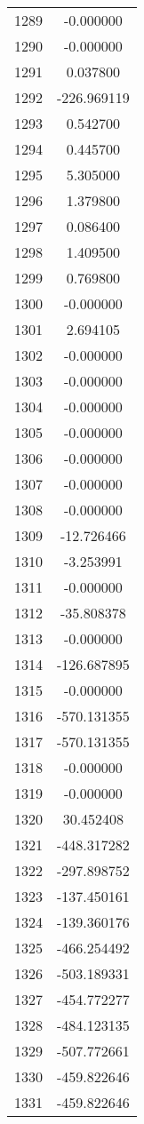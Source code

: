 \documentclass[12pt]{article}
\begin{document}
\begin{longtable}{@{}cc@{}}
1289 & -0.000000 \\
1290 & -0.000000 \\
1291 & 0.037800 \\
1292 & -226.969119 \\
1293 & 0.542700 \\
1294 & 0.445700 \\
1295 & 5.305000 \\
1296 & 1.379800 \\
1297 & 0.086400 \\
1298 & 1.409500 \\
1299 & 0.769800 \\
1300 & -0.000000 \\
1301 & 2.694105 \\
1302 & -0.000000 \\
1303 & -0.000000 \\
1304 & -0.000000 \\
1305 & -0.000000 \\
1306 & -0.000000 \\
1307 & -0.000000 \\
1308 & -0.000000 \\
1309 & -12.726466 \\
1310 & -3.253991 \\
1311 & -0.000000 \\
1312 & -35.808378 \\
1313 & -0.000000 \\
1314 & -126.687895 \\
1315 & -0.000000 \\
1316 & -570.131355 \\
1317 & -570.131355 \\
1318 & -0.000000 \\
1319 & -0.000000 \\
1320 & 30.452408 \\
1321 & -448.317282 \\
1322 & -297.898752 \\
1323 & -137.450161 \\
1324 & -139.360176 \\
1325 & -466.254492 \\
1326 & -503.189331 \\
1327 & -454.772277 \\
1328 & -484.123135 \\
1329 & -507.772661 \\
1330 & -459.822646 \\
1331 & -459.822646 \\

\end{longtable}
\end{document}
